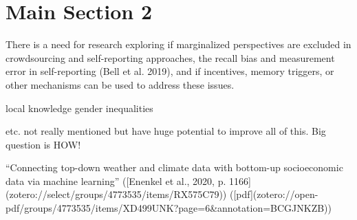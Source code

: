 
\section{Main Section 2}

There is a need for research exploring if marginalized perspectives are excluded in crowdsourcing and self-reporting approaches, the recall bias and measurement error in self-reporting (Bell et al. 2019), and if incentives, memory triggers, or other mechanisms can be used to address these issues.


local knowledge
gender inequalities

etc. not really mentioned but have huge potential to improve all of this. Big question is HOW!

“Connecting top-down weather and climate data with bottom-up socioeconomic data via machine learning” ([Enenkel et al., 2020, p. 1166](zotero://select/groups/4773535/items/RX575C79)) ([pdf](zotero://open-pdf/groups/4773535/items/XD499UNK?page=6&annotation=BCGJNKZB))

